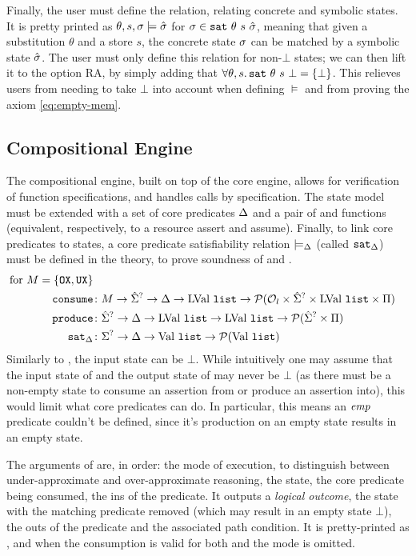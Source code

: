 Finally, the user must define the  relation, relating concrete and symbolic states. It is pretty printed as $\theta,s,\sigma\models \hat{\sigma}$ for $\sigma\in\texttt{sat}~\theta~s~\hat{\sigma}$, meaning that given a substitution $\theta$ and a store $s$, the concrete state $\sigma$ can be matched by a symbolic state $\hat{\sigma}$. The user must only define this relation for non-$\bot$ states; we can then lift it to the option RA, by simply adding that $\forall \theta, s\ldotp \texttt{sat}~\theta~s~\bot=\{\bot\}$. This relieves users from needing to take $\bot$ into account when defining $\models$ and from proving the axiom \ref{eq:empty-mem}.

\subsection{Compositional Engine}

The compositional engine, built on top of the core engine, allows for verification of function specifications, and handles calls by specification. The state model must be extended with a set of core predicates $\Delta$ and a pair of \consume{} and \produce{} functions (equivalent, respectively, to a resource assert and assume). Finally, to link core predicates to states, a core predicate satisfiability relation $\models_{\Delta}$ (called $\texttt{sat}_{\Delta}$) must be defined in the theory, to prove soundness of \consume{} and \produce.
\begin{align*}
	\text{for }M=\{\texttt{OX}, \texttt{UX}\}\\
	\texttt{consume} &\colon M\rightarrow \hat{\Sigma}^? \rightarrow \Delta \rightarrow \text{LVal}~\texttt{list} \rightarrow {\cal P}({\cal O}_l \times \hat{\Sigma}^? \times \text{LVal}~\texttt{list} \times \Pi) \\
	\texttt{produce} &\colon \hat{\Sigma}^? \rightarrow \Delta \rightarrow \text{LVal}~\texttt{list} \rightarrow \text{LVal}~\texttt{list} \rightarrow {\cal P}(\hat{\Sigma}^? \times \Pi)\\
	\texttt{sat}_\Delta &\colon\Sigma^? \rightarrow \Delta \rightarrow \text{Val}~\texttt{list} \rightarrow {\cal P}(\text{Val}~\texttt{list})
\end{align*}
Similarly to \execac, the input state can be $\bot$. While intuitively one may assume that the input state of \consume{} and the output state of \produce{} may never be $\bot$ (as there must be a non-empty state to consume an assertion from or produce an assertion into), this would limit what core predicates can do. In particular, this means an $\textit{emp}$ predicate couldn't be defined, since it's production on an empty state results in an empty state.

The arguments of \consume{} are, in order: the mode of execution, to distinguish between under-approximate and over-approximate reasoning, the state, the core predicate being consumed, the ins of the predicate. It outputs a \emph{logical outcome}, the state with the matching predicate removed (which may result in an empty state $\bot$), the outs of the predicate and the associated path condition. It is pretty-printed as , and when the consumption is valid for both \OX{} and \UX{} the mode is omitted.

